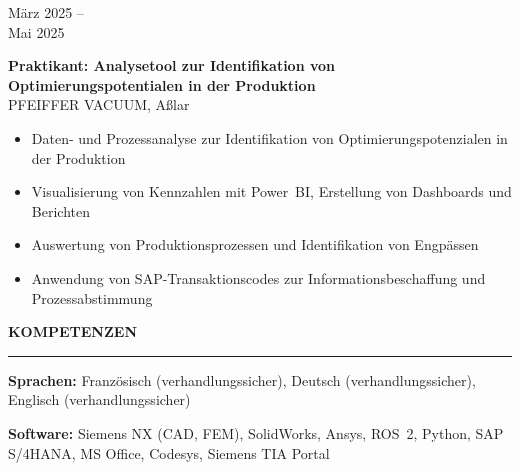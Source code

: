 \documentclass[11pt,a4paper]{article}
\newcommand{\sectionhead}[1]{%
  \vspace{1.1em}
  {\large\bfseries\color{accent}\MakeUppercase{#1}}\\[-0.35em]
  {\color{accent!50}\rule{\linewidth}{0.5pt}}\vspace{0.5em}}
\newcommand{\entry}[4]{%
  \noindent
  \begin{minipage}[t]{2.9cm}\raggedright\small\color{lightgray}#1\end{minipage}%
  \hspace{0.3cm}%
  \begin{minipage}[t]{\dimexpr\linewidth-3.2cm\relax}
    {\normalsize\bfseries\color{black!90}#2}\\[-0.1em]
    {\small\color{accent}#3}
    \begin{itemize}[leftmargin=1.1em,itemsep=0.1em,topsep=0.3em,parsep=0pt,label={\tiny$\bullet$}]
      \small #4
    \end{itemize}
  \end{minipage}\par\vspace{0.55em}}
\begin{document}
\entry{März 2025 --\\ Mai 2025}
{Praktikant: Analysetool zur Identifikation von Optimierungspotentialen in der Produktion}
{PFEIFFER VACUUM, Aßlar}
{\item Daten- und Prozessanalyse zur Identifikation von Optimierungspotenzialen in der Produktion
 \item Visualisierung von Kennzahlen mit Power~BI, Erstellung von Dashboards und Berichten
 \item Auswertung von Produktionsprozessen und Identifikation von Engpässen
 \item Anwendung von SAP-Transaktionscodes zur Informationsbeschaffung und Prozessabstimmung}

\sectionhead{Kompetenzen}

\noindent\small\textbf{Sprachen:} Französisch (verhandlungssicher), Deutsch (verhandlungssicher), Englisch (verhandlungssicher)\par
\vspace{0.4em}
\noindent\small\textbf{Software:} Siemens NX (CAD, FEM), SolidWorks, Ansys, ROS~2, Python, SAP S/4HANA, MS Office, Codesys, Siemens TIA Portal\par
\end{document}
